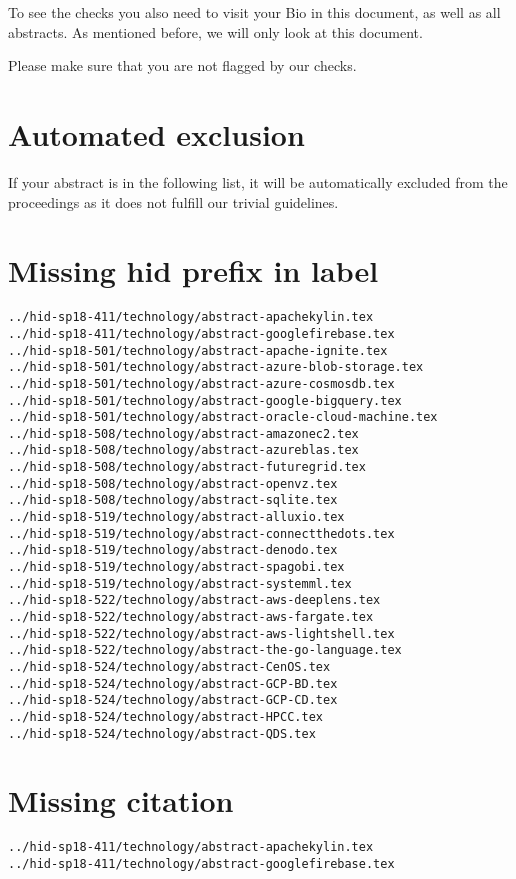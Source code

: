 To see the checks you also need to visit your Bio in this document, as
well as all abstracts. As mentioned before, we will only look at this
document.

Please make sure that you are not flagged by our checks. 

\section{Automated exclusion}

If your abstract is in the following list, it will be automatically
excluded from the proceedings as it does not fulfill our trivial
guidelines.

\section{Missing hid prefix in label}
\begin{verbatim}
../hid-sp18-411/technology/abstract-apachekylin.tex
../hid-sp18-411/technology/abstract-googlefirebase.tex
../hid-sp18-501/technology/abstract-apache-ignite.tex
../hid-sp18-501/technology/abstract-azure-blob-storage.tex
../hid-sp18-501/technology/abstract-azure-cosmosdb.tex
../hid-sp18-501/technology/abstract-google-bigquery.tex
../hid-sp18-501/technology/abstract-oracle-cloud-machine.tex
../hid-sp18-508/technology/abstract-amazonec2.tex
../hid-sp18-508/technology/abstract-azureblas.tex
../hid-sp18-508/technology/abstract-futuregrid.tex
../hid-sp18-508/technology/abstract-openvz.tex
../hid-sp18-508/technology/abstract-sqlite.tex
../hid-sp18-519/technology/abstract-alluxio.tex
../hid-sp18-519/technology/abstract-connectthedots.tex
../hid-sp18-519/technology/abstract-denodo.tex
../hid-sp18-519/technology/abstract-spagobi.tex
../hid-sp18-519/technology/abstract-systemml.tex
../hid-sp18-522/technology/abstract-aws-deeplens.tex
../hid-sp18-522/technology/abstract-aws-fargate.tex
../hid-sp18-522/technology/abstract-aws-lightshell.tex
../hid-sp18-522/technology/abstract-the-go-language.tex
../hid-sp18-524/technology/abstract-CenOS.tex
../hid-sp18-524/technology/abstract-GCP-BD.tex
../hid-sp18-524/technology/abstract-GCP-CD.tex
../hid-sp18-524/technology/abstract-HPCC.tex
../hid-sp18-524/technology/abstract-QDS.tex

\end{verbatim}
\section{Missing citation}
\begin{verbatim}
../hid-sp18-411/technology/abstract-apachekylin.tex
../hid-sp18-411/technology/abstract-googlefirebase.tex

\end{verbatim}
